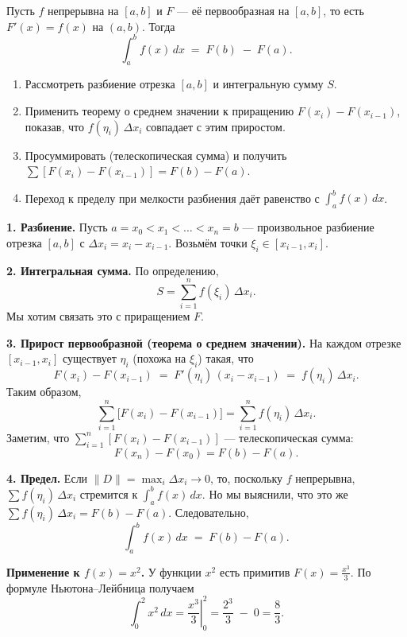 
\begin{customtheorem}
	Пусть $f$ непрерывна на $[a,b]$ и $F$ — её первообразная на $[a,b]$, то есть $F'(x)=f(x)$ на $(a,b)$.
	Тогда
	\[
		\int_a^b f(x)\,dx \;=\; F(b) \;-\; F(a).
	\]
\end{customtheorem}

\begin{proofplan}
	\begin{enumerate}
		\item Рассмотреть разбиение отрезка $[a,b]$ и интегральную сумму $S$.
		\item Применить теорему о среднем значении к приращению $F(x_i)-F(x_{i-1})$,
		      показав, что $f(\eta_i)\,\Delta x_i$ совпадает с этим приростом.
		\item Просуммировать (телескопическая сумма) и получить
		      $\sum [F(x_i)-F(x_{i-1})] = F(b)-F(a)$.
		\item Переход к пределу при мелкости разбиения даёт равенство с $\int_a^b f(x)\,dx$.
	\end{enumerate}
\end{proofplan}

\begin{customproof}
	\textbf{1. Разбиение.} Пусть $a=x_0 < x_1 < \dots < x_n = b$ — произвольное разбиение отрезка $[a,b]$ с
	$\Delta x_i = x_i - x_{i-1}$. Возьмём точки $\xi_i \in [x_{i-1}, x_i]$.

	\smallskip

	\textbf{2. Интегральная сумма.} По определению,
	\[
		S = \sum_{i=1}^n f(\xi_i)\,\Delta x_i.
	\]
	Мы хотим связать это с приращением $F$.

	\smallskip

	\textbf{3. Прирост первообразной (теорема о среднем значении).}
	На каждом отрезке $[x_{i-1}, x_i]$ существует $\eta_i$ (похожа на $\xi_i$) такая, что
	\[
		F(x_i) - F(x_{i-1})
		\;=\; F'(\eta_i)\,(x_i - x_{i-1})
		\;=\; f(\eta_i)\,\Delta x_i.
	\]
	Таким образом,
	\[
		\sum_{i=1}^n \bigl[F(x_i)-F(x_{i-1})\bigr]
		= \sum_{i=1}^n f(\eta_i)\,\Delta x_i.
	\]
	Заметим, что $\sum_{i=1}^n [F(x_i)-F(x_{i-1})]$ — телескопическая сумма:
	\[
		F(x_n)-F(x_0) = F(b)-F(a).
	\]

	\smallskip

	\textbf{4. Предел.}
	Если $\|D\| = \max_i \Delta x_i \to 0$, то, поскольку $f$ непрерывна,
	\(\sum f(\eta_i)\,\Delta x_i\) стремится к \(\int_a^b f(x)\,dx\).
	Но мы выяснили, что это же $\sum f(\eta_i)\,\Delta x_i = F(b)-F(a)$.
	Следовательно,
	\[
		\int_a^b f(x)\,dx \;=\; F(b)-F(a).
	\]
\end{customproof}

\begin{customexample}
	\textbf{Применение к $f(x)=x^2$.}
	У функции $x^2$ есть примитив $F(x)=\tfrac{x^3}{3}$. По формуле Ньютона–Лейбница получаем
	\[
		\int_0^2 x^2\,dx
		=
		\left.\frac{x^3}{3}\right|_0^2
		=
		\frac{2^3}{3}\;-\;0
		=
		\frac{8}{3}.
	\]
\end{customexample}
